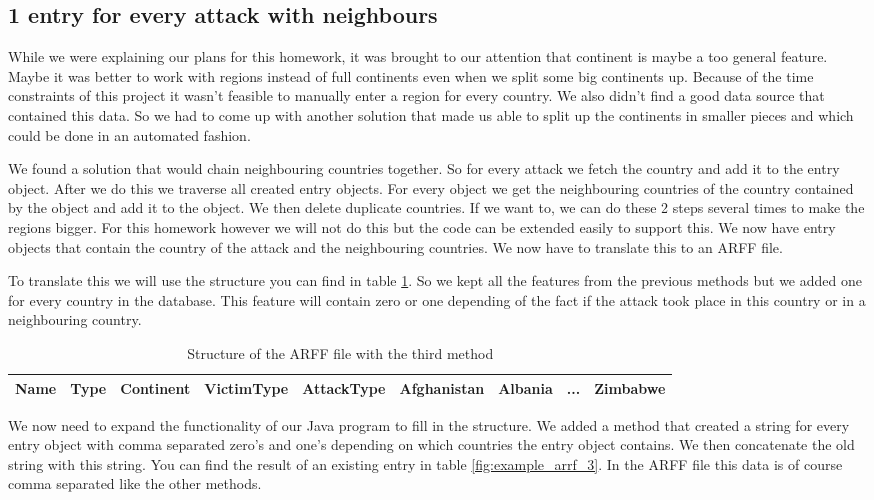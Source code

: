 \documentclass[a4]{article}
\begin{document}
\subsection{1 entry for every attack with neighbours}
\label{sec:withneighbours}
While we were explaining our plans for this homework, it was brought to our attention that continent is maybe a too general feature. Maybe it was better to work with regions instead of full continents even when we split some big continents up. Because of the time constraints of this project it wasn't feasible to manually enter a region for every country. We also didn't find a good data source that contained this data. So we had to come up with another solution that made us able to split up the continents in smaller pieces and which could be done in an automated fashion.\par
We found a solution that would chain neighbouring  countries together. So for every attack we fetch the country and add it to the entry object. After we do this we traverse all created entry objects. For every object we get the neighbouring countries of the country contained by the object and add it to the object. We then delete duplicate countries. If we want to, we can do these 2 steps several times to make the regions bigger. For this homework however we will not do this but the code can be extended easily to support this. We now have entry objects that contain the country of the attack and the neighbouring countries. We now have to translate this to an ARFF file.\par
To translate this we will use the structure you can find in table \ref{fig:structure_arrf_3}. So we kept all the features from the previous methods but we added one for every country in the database. This feature will contain zero or one depending of the fact if the attack took place in this country or in a neighbouring country.\par
\begin{table}[!h]
\centering
\begin{tabular}{|c|c|c|c|c|c|c|c|c|}\hline
Name & Type & Continent & VictimType & AttackType & Afghanistan & Albania & ... & Zimbabwe \\ \hline
\end{tabular}
\caption{Structure of the ARFF file with the third method}
\label{fig:structure_arrf_3}
\end{table}
We now need to expand the functionality of our Java program to fill in the structure. We added a method that created a string for every entry object with comma separated zero's and one's depending on which countries the entry object contains. We then concatenate the old string with this string. You can find the result of an existing entry in table \ref{fig:example_arrf_3}. In the ARFF file this data is of course comma separated like the other methods.\par
\end{document}
